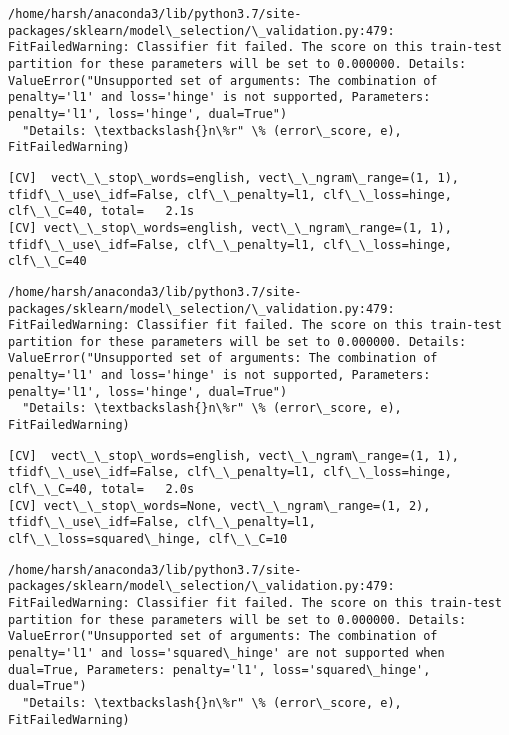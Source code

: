 \documentclass[11pt]{article}
\begin{document}
    \begin{Verbatim}[commandchars=\\\{\}]
/home/harsh/anaconda3/lib/python3.7/site-packages/sklearn/model\_selection/\_validation.py:479: FitFailedWarning: Classifier fit failed. The score on this train-test partition for these parameters will be set to 0.000000. Details: 
ValueError("Unsupported set of arguments: The combination of penalty='l1' and loss='hinge' is not supported, Parameters: penalty='l1', loss='hinge', dual=True")
  "Details: \textbackslash{}n\%r" \% (error\_score, e), FitFailedWarning)

    \end{Verbatim}

    \begin{Verbatim}[commandchars=\\\{\}]
[CV]  vect\_\_stop\_words=english, vect\_\_ngram\_range=(1, 1), tfidf\_\_use\_idf=False, clf\_\_penalty=l1, clf\_\_loss=hinge, clf\_\_C=40, total=   2.1s
[CV] vect\_\_stop\_words=english, vect\_\_ngram\_range=(1, 1), tfidf\_\_use\_idf=False, clf\_\_penalty=l1, clf\_\_loss=hinge, clf\_\_C=40 

    \end{Verbatim}

    \begin{Verbatim}[commandchars=\\\{\}]
/home/harsh/anaconda3/lib/python3.7/site-packages/sklearn/model\_selection/\_validation.py:479: FitFailedWarning: Classifier fit failed. The score on this train-test partition for these parameters will be set to 0.000000. Details: 
ValueError("Unsupported set of arguments: The combination of penalty='l1' and loss='hinge' is not supported, Parameters: penalty='l1', loss='hinge', dual=True")
  "Details: \textbackslash{}n\%r" \% (error\_score, e), FitFailedWarning)

    \end{Verbatim}

    \begin{Verbatim}[commandchars=\\\{\}]
[CV]  vect\_\_stop\_words=english, vect\_\_ngram\_range=(1, 1), tfidf\_\_use\_idf=False, clf\_\_penalty=l1, clf\_\_loss=hinge, clf\_\_C=40, total=   2.0s
[CV] vect\_\_stop\_words=None, vect\_\_ngram\_range=(1, 2), tfidf\_\_use\_idf=False, clf\_\_penalty=l1, clf\_\_loss=squared\_hinge, clf\_\_C=10 

    \end{Verbatim}

    \begin{Verbatim}[commandchars=\\\{\}]
/home/harsh/anaconda3/lib/python3.7/site-packages/sklearn/model\_selection/\_validation.py:479: FitFailedWarning: Classifier fit failed. The score on this train-test partition for these parameters will be set to 0.000000. Details: 
ValueError("Unsupported set of arguments: The combination of penalty='l1' and loss='squared\_hinge' are not supported when dual=True, Parameters: penalty='l1', loss='squared\_hinge', dual=True")
  "Details: \textbackslash{}n\%r" \% (error\_score, e), FitFailedWarning)

    \end{Verbatim}
\end{document}
